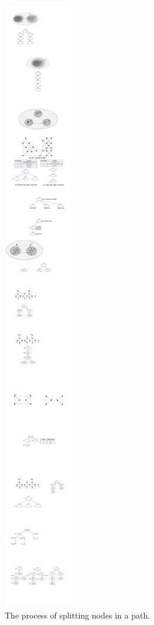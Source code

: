 \begin{figure}[ht]
    \centering
    \includegraphics[width=1\linewidth]{figures/steps}
    \caption{The process of splitting nodes in a path.}
    \label{fig:steps}
\end{figure}

